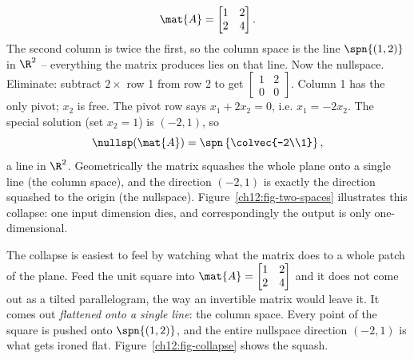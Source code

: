 \begin{example}\label{ch12:nullspace-line}
\[
  \mat{A} = \begin{bmatrix} 1 & 2 \\ 2 & 4 \end{bmatrix}.
\]
The second column is twice the first, so the column space is the line
$\spn\{(1,2)\}$ in $\R^2$ -- everything the matrix produces lies on that line.
Now the nullspace. Eliminate: subtract $2\times$ row 1 from row 2 to get
$\begin{bmatrix}1 & 2\\0 & 0\end{bmatrix}$. Column 1 has the only pivot; $x_2$ is
free. The pivot row says $x_1 + 2x_2 = 0$, i.e. $x_1 = -2x_2$. The special
solution (set $x_2=1$) is $(-2,1)$, so
\[
  \nullsp(\mat{A}) = \spn\left\{\colvec{-2\\1}\right\},
\]
a line in $\R^2$. Geometrically the matrix squashes the whole plane onto a single
line (the column space), and the direction $(-2,1)$ is exactly the direction
squashed to the origin (the nullspace). Figure~\ref{ch12:fig-two-spaces}
illustrates this collapse: one input dimension dies, and correspondingly the
output is only one-dimensional.
\end{example}

The collapse is easiest to feel by watching what the matrix does to a whole
patch of the plane. Feed the unit square into $\mat{A}=\begin{bmatrix}1&2\\2&4
\end{bmatrix}$ and it does not come out as a tilted parallelogram, the way an
invertible matrix would leave it. It comes out \emph{flattened onto a single
line}: the column space. Every point of the square is pushed onto
$\spn\{(1,2)\}$, and the entire nullspace direction $(-2,1)$ is what gets
ironed flat. Figure~\ref{ch12:fig-collapse} shows the squash.

